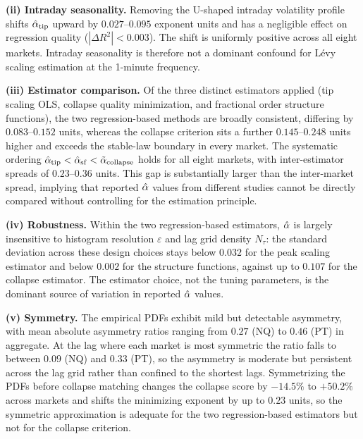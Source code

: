 \documentclass[conference]{IEEEtran}
\begin{document}
\textbf{(ii) Intraday seasonality.}
Removing the U-shaped intraday volatility profile shifts $\hat{\alpha}_{\mathrm{tip}}$
upward by $0.027$--$0.095$ exponent units and has a negligible effect on regression
quality ($|\Delta R^2|<0.003$).
The shift is uniformly positive across all eight markets.
Intraday seasonality is therefore not a dominant confound for Lévy scaling
estimation at the 1-minute frequency.

\textbf{(iii) Estimator comparison.}
Of the three distinct estimators applied (tip scaling OLS, collapse quality
minimization, and fractional order structure functions), the two
regression-based methods are broadly consistent, differing by $0.083$--$0.152$
units, whereas the collapse criterion sits a further $0.145$--$0.248$ units
higher and exceeds the stable-law boundary in every market.
The systematic ordering $\hat{\alpha}_{\mathrm{tip}}<\hat{\alpha}_{\mathrm{sf}}<
\tilde{\alpha}_{\mathrm{collapse}}$ holds for all eight markets, with
inter-estimator spreads of $0.23$--$0.36$ units.
This gap is substantially larger than the inter-market spread, implying that
reported $\hat{\alpha}$ values from different studies cannot be directly compared
without controlling for the estimation principle.

\textbf{(iv) Robustness.}
Within the two regression-based estimators, $\hat{\alpha}$ is largely insensitive
to histogram resolution $\varepsilon$ and lag grid density $N_\tau$: the
standard deviation across these design choices stays below $0.032$ for the
peak scaling estimator and below $0.002$ for the structure functions, against
up to $0.107$ for the collapse estimator.
The estimator choice, not the tuning parameters, is the dominant source of
variation in reported $\hat{\alpha}$ values.

\textbf{(v) Symmetry.}
The empirical PDFs exhibit mild but detectable asymmetry,
with mean absolute asymmetry ratios ranging from $0.27$ (NQ) to $0.46$ (PT)
in aggregate.
At the lag where each market is most symmetric the ratio falls to between
$0.09$ (NQ) and $0.33$ (PT), so the asymmetry is moderate but persistent
across the lag grid rather than confined to the shortest lags.
Symmetrizing the PDFs before collapse matching changes the collapse score by
$-14.5\%$ to $+50.2\%$ across markets and shifts the minimizing exponent by up
to $0.23$ units, so the symmetric approximation is adequate for the two
regression-based estimators but not for the collapse criterion.
\end{document}

